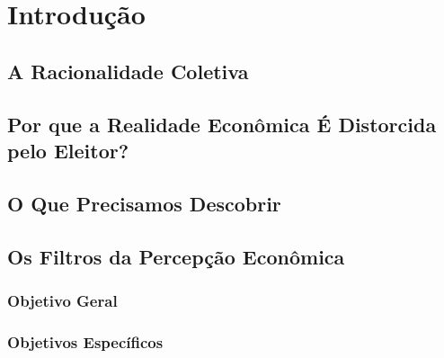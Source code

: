 

\chapter{Introdução} %



\section{A Racionalidade Coletiva} %




\section{Por que a Realidade Econômica É Distorcida pelo Eleitor?} %


\section{O Que Precisamos Descobrir} %





\section{Os Filtros da Percepção Econômica} %




\subsection{Objetivo Geral} %




\subsection{Objetivos Específicos} %





